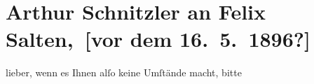 

\renewcommand{\erwaehntePersonen}{Personen: Josef Kaufmann, Marie Reinhard, Felix Salten}
\renewcommand{\erwaehnteInstitutionen}{Institutionen: Jung-Wiener Theater zum Lieben Augustin}
\renewcommand{\erwaehnteOrte}{Orte: Raimund-Theater, Wien}
\renewcommand{\erwaehnteWerke}{Werke: Tagebuch}
\section[ Arthur Schnitzler an Felix Salten, {[}vor dem 16. 5. 1896?{]}]{Arthur Schnitzler an Felix Salten, {[}vor dem 16. 5. 1896?{]}}
\nopagebreak{}
\rehead{ }\normalsize\beginnumbering{}
\toendnotes[C]{\smallbreak\pagebreak[2]}
\toendnotes[C]{\smallbreak}
\pstart
           \noindent{}{\pb}lieber, wenn es Ihnen alſo keine Umſtände macht, bitte
